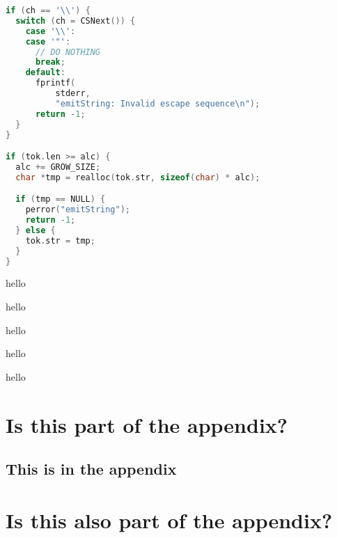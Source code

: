 \documentclass{uom-coursework}
\begin{document}
\begin{lstlisting}[caption={The section in \texttt{emitString()}
which handles escaping.},language=C]
if (ch == '\\') {
  switch (ch = CSNext()) {
    case '\\':
    case '"':
      // DO NOTHING
      break;
    default:
      fprintf(
          stderr,
          "emitString: Invalid escape sequence\n");
      return -1;
  }
}

if (tok.len >= alc) {
  alc += GROW_SIZE;
  char *tmp = realloc(tok.str, sizeof(char) * alc);

  if (tmp == NULL) {
    perror("emitString");
    return -1;
  } else {
    tok.str = tmp;
  }
}
\end{lstlisting}

\begin{prop}
  hello
\end{prop}
\begin{thm}
  hello
\end{thm}
\begin{conj}
  hello
\end{conj}
\begin{cor}
  hello
\end{cor}
\begin{lma}
  hello
\end{lma}


\appendix

\chapter{Is this part of the appendix?}
\section{This is in the appendix}
\chapter{Is this also part of the appendix?}
\end{document}
